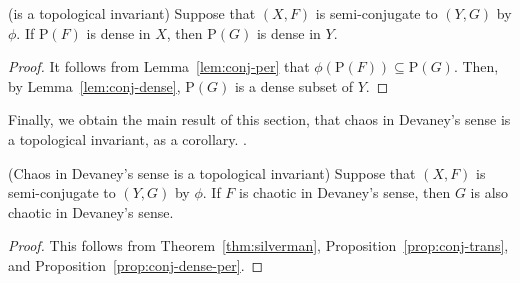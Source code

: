 \documentclass[10pt,draft,twoside]{book}
\begin{document}
\begin{proposition}
  (\dpp is a topological invariant)
  Suppose that $(X,F)$ is semi-conjugate to $(Y,G)$ by $\phi$.
  If $\mathrm{P}(F)$ is dense in $X$, then $\mathrm{P}(G)$ is dense in $Y$.
  \label{prop:conj-dense-per}
  \begin{proof}
    It follows from Lemma~\ref{lem:conj-per} that $\phi(\mathrm{P}(F)) \subseteq \mathrm{P}(G)$.
    Then, by Lemma~\ref{lem:conj-dense}, $\mathrm{P}(G)$ is a dense subset of $Y$.
  \end{proof}
\end{proposition}
Finally, we obtain the main result of this section, that chaos in Devaney's sense is a topological invariant, as a corollary.
.
\begin{corollary}
  (Chaos in Devaney's sense is a topological invariant)
  Suppose that $(X,F)$ is semi-conjugate to $(Y,G)$ by $\phi$.
  If $F$ is chaotic in Devaney's sense, then $G$ is also chaotic in Devaney's sense.
  \label{cor:conj-sdic}
  \begin{proof}
    This follows from Theorem~\ref{thm:silverman}, Proposition~\ref{prop:conj-trans}, and Proposition~\ref{prop:conj-dense-per}.
  \end{proof}
\end{corollary}
\end{document}
